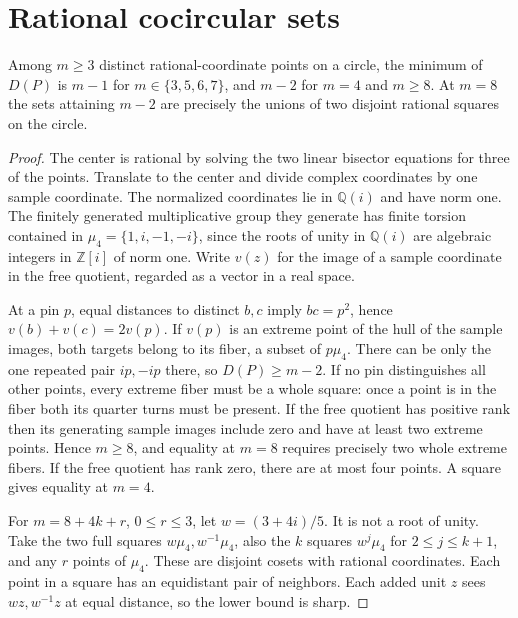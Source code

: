 \section{Rational cocircular sets}

\begin{theorem}[982-C06, 982-C07]
Among \(m\ge3\) distinct rational-coordinate points on a circle, the minimum of \(D(P)\) is \(m-1\) for \(m\in\{3,5,6,7\}\), and \(m-2\) for \(m=4\) and \(m\ge8\). At \(m=8\) the sets attaining \(m-2\) are precisely the unions of two disjoint rational squares on the circle.
\end{theorem}

\begin{proof}
The center is rational by solving the two linear bisector equations for three of the points. Translate to the center and divide complex coordinates by one sample coordinate. The normalized coordinates lie in \(\mathbb Q(i)\) and have norm one. The finitely generated multiplicative group they generate has finite torsion contained in \(\mu_4=\{1,i,-1,-i\}\), since the roots of unity in \(\mathbb Q(i)\) are algebraic integers in \(\mathbb Z[i]\) of norm one. Write \(v(z)\) for the image of a sample coordinate in the free quotient, regarded as a vector in a real space.

At a pin \(p\), equal distances to distinct \(b,c\) imply \(bc=p^2\), hence \(v(b)+v(c)=2v(p)\). If \(v(p)\) is an extreme point of the hull of the sample images, both targets belong to its fiber, a subset of \(p\mu_4\). There can be only the one repeated pair \(ip,-ip\) there, so \(D(P)\ge m-2\). If no pin distinguishes all other points, every extreme fiber must be a whole square: once a point is in the fiber both its quarter turns must be present. If the free quotient has positive rank then its generating sample images include zero and have at least two extreme points. Hence \(m\ge8\), and equality at \(m=8\) requires precisely two whole extreme fibers. If the free quotient has rank zero, there are at most four points. A square gives equality at \(m=4\).

For \(m=8+4k+r\), \(0\le r\le3\), let \(w=(3+4i)/5\). It is not a root of unity. Take the two full squares \(w\mu_4,w^{-1}\mu_4\), also the \(k\) squares \(w^j\mu_4\) for \(2\le j\le k+1\), and any \(r\) points of \(\mu_4\). These are disjoint cosets with rational coordinates. Each point in a square has an equidistant pair of neighbors. Each added unit \(z\) sees \(wz,w^{-1}z\) at equal distance, so the lower bound is sharp.
\end{proof}

